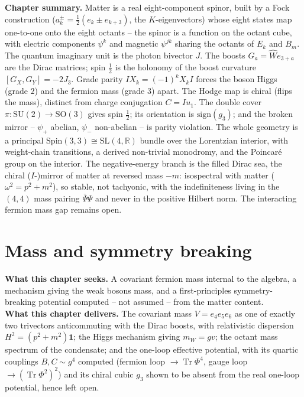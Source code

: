 \documentclass[11pt,oneside]{book}
\newcommand{\Wh}{\hat{W}}                         %
\newcommand{\Tr}{\operatorname{Tr}}
\newcommand{\RR}{\mathbb{R}}
\newcommand{\Spin}{\mathrm{Spin}}
\theoremstyle{plain}
\theoremstyle{definition}
\theoremstyle{remark}
\begin{document}
\begin{leavesbox}
\textbf{Chapter summary.} Matter is a real eight-component spinor, built by a Fock
construction ($a_k^{\pm}=\tfrac12(e_k\pm e_{k+3})$, the $K$-eigenvectors) whose eight
states map one-to-one onto the eight octants -- the spinor is a function on the
octant cube, with electric components $\psi^k$ and magnetic $\psi^{jk}$ sharing the
octants of $E_k$ and $B_m$. The quantum imaginary unit is the photon bivector $J$.
The boosts $G_a=\Wh e_{3+a}$ are the Dirac matrices; spin $\tfrac12$ is the
holonomy of the boost curvature $[G_X,G_Y]=-2J_3$. Grade parity
$IX_k=(-1)^kX_kI$ forces the boson Higgs (grade $2$) and the fermion mass (grade
$3$) apart. The Hodge map is chiral (flips the mass), distinct from charge
conjugation $C=Iu_1$. The double cover $\pi:\mathrm{SU}(2)\to\mathrm{SO}(3)$ gives
spin $\tfrac12$; its orientation is $\mathrm{sign}(g_3)$; and the broken mirror --
$\psi_+$ abelian, $\psi_-$ non-abelian -- is parity violation. The whole geometry is
a principal $\Spin(3,3)\cong\mathrm{SL}(4,\RR)$ bundle over the Lorentzian interior,
with weight-chain transitions, a derived non-trivial monodromy, and the Poincar\'e
group on the interior. The negative-energy branch is the filled Dirac sea, the
chiral ($I$-)mirror of matter at reversed mass $-m$: isospectral with matter
($\omega^2=p^2+m^2$), so stable, not tachyonic, with the indefiniteness living in the
$(4,4)$ mass pairing $\bar\Psi\Psi$ and never in the positive Hilbert norm. The
interacting fermion mass gap remains open.
\end{leavesbox}

\chapter{Mass and symmetry breaking}
\label{ch:mass}

\begin{leavesbox}
\textbf{What this chapter seeks.} A covariant fermion mass internal to the algebra,
a mechanism giving the weak bosons mass, and a first-principles symmetry-breaking
potential computed -- not assumed -- from the matter content.\\[2pt]
\textbf{What this chapter delivers.} The covariant mass $V=e_4e_5e_6$ as one of
exactly two trivectors anticommuting with the Dirac boosts, with relativistic
dispersion $H^2=(p^2+m^2)\mathbf 1$; the Higgs mechanism giving $m_W=gv$; the octant
mass spectrum of the condensate; and the one-loop effective potential, with its
quartic couplings $B,C\sim g^4$ computed (fermion loop $\to\Tr\Phi^4$, gauge loop
$\to(\Tr\Phi^2)^2$) and its chiral cubic $g_3$ shown to be absent from the real
one-loop potential, hence left open.
\end{leavesbox}
\end{document}
